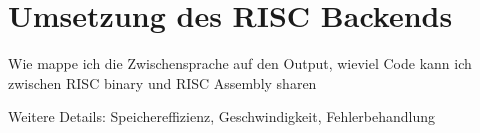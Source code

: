 \chapter{Umsetzung des RISC Backends}
\label{chapter}

Wie mappe ich die Zwischensprache auf den Output, wieviel Code kann ich zwischen RISC binary und RISC Assembly sharen

Weitere Details: Speichereffizienz, Geschwindigkeit, Fehlerbehandlung

